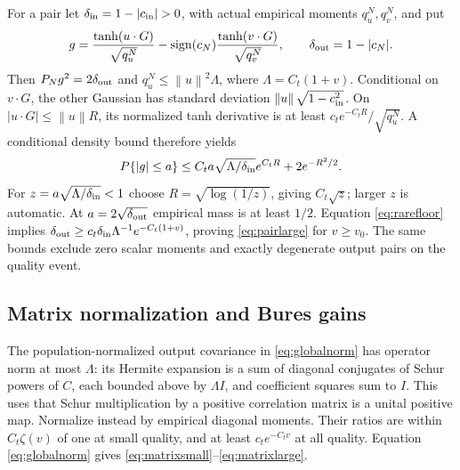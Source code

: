 \documentclass[11pt]{article}
\newcommand{\sgn}{\operatorname{sign}}\newcommand{\op}{\mathrm{op}}
\newcommand{\norm}[1]{\left\lVert#1\right\rVert}
\begin{document}
For a pair let $\delta_{\rm in}=1-|c_{\rm in}|>0$, with actual empirical moments $q_u^N,q_v^N$, and put
\[
 g=\frac{\tanh(u\cdot G)}{\sqrt{q_u^N}}
   -\sgn(c_N)\frac{\tanh(v\cdot G)}{\sqrt{q_v^N}},\qquad
 \delta_{\rm out}=1-|c_N|.
\]
Then $P_Ng^2=2\delta_{\rm out}$ and $q_u^N\le\norm u^2\Lambda$, where $\Lambda=C_t(1+v)$. Conditional on $v\cdot G$, the other Gaussian has standard deviation $\norm u\sqrt{1-c_{\rm in}^2}$. On $|u\cdot G|\le\norm u R$, its normalized tanh derivative is at least $c_te^{-C_tR}/\sqrt{q_u^N}$. A conditional density bound therefore yields
\[
 P\{|g|\le a\}\le C_ta\sqrt{\Lambda/\delta_{\rm in}}e^{C_tR}+2e^{-R^2/2}.
\]
For $z=a\sqrt{\Lambda/\delta_{\rm in}}<1$ choose $R=\sqrt{\log(1/z)}$, giving $C_t\sqrt z$; larger $z$ is automatic. At $a=2\sqrt{\delta_{\rm out}}$ empirical mass is at least $1/2$. Equation \eqref{eq:rarefloor} implies
$\delta_{\rm out}\ge c_t\delta_{\rm in}\Lambda^{-1}e^{-C_t(1+v)}$, proving \eqref{eq:pairlarge} for $v\ge v_0$. The same bounds exclude zero scalar moments and exactly degenerate output pairs on the quality event.

\subsection{Matrix normalization and Bures gains}
The population-normalized output covariance in \eqref{eq:globalnorm} has operator norm at most $\Lambda$: its Hermite expansion is a sum of diagonal conjugates of Schur powers of $C$, each bounded above by $\Lambda I$, and coefficient squares sum to $I$. This uses that Schur multiplication by a positive correlation matrix is a unital positive map. Normalize instead by empirical diagonal moments. Their ratios are within $C_t\zeta(v)$ of one at small quality, and at least $c_te^{-C_tv}$ at all quality. Equation \eqref{eq:globalnorm} gives \eqref{eq:matrixsmall}--\eqref{eq:matrixlarge}.
\end{document}
